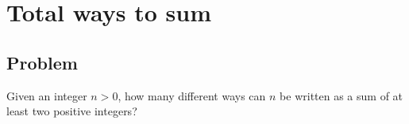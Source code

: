 
\section{Total ways to sum}



\subsection*{Problem}

Given an integer $n > 0$, how many different ways can $n$ be written
as a sum of at least two positive integers?
